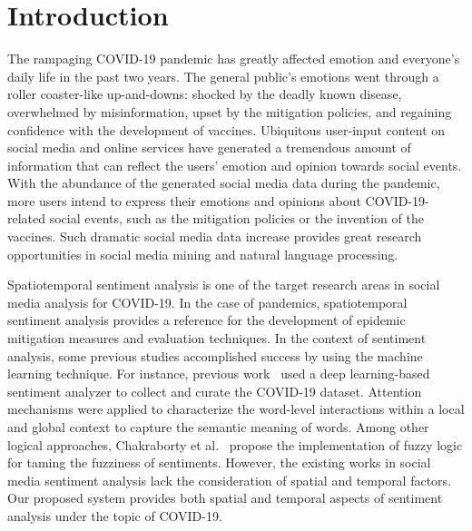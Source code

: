 \section{Introduction}
\label{sec:intro}
The rampaging COVID-19 pandemic has greatly affected emotion and everyone’s
daily life in the past two years. The general public’s emotions went through
a roller coaster-like up-and-downs: shocked by the deadly known disease,
overwhelmed by misinformation, upset by the mitigation policies, and
regaining confidence with the development of vaccines. Ubiquitous user-input
content on social media and online services have generated a tremendous
amount of information that can reflect the users’ emotion and opinion towards
social events. With the abundance of the generated social media data during
the pandemic, more users intend to express their emotions and opinions about
COVID-19-related social events, such as the mitigation policies or the
invention of the vaccines. Such dramatic social media data increase provides
great research opportunities in social media mining and natural language
processing.  

Spatiotemporal sentiment analysis is one of the target research areas in
social media analysis for COVID-19. In the case of pandemics, spatiotemporal
sentiment analysis provides a reference for the development of epidemic
mitigation measures and evaluation techniques. In the context of sentiment
analysis, some previous studies accomplished success by using the machine
learning technique. For instance, previous work~\cite{kastrati2021deep} used
a deep learning-based sentiment analyzer to collect and curate the COVID-19
dataset. Attention mechanisms were applied to characterize the word-level
interactions within a local and global context to capture the semantic
meaning of words. Among other logical approaches, Chakraborty et al.~\cite
{chakraborty2020sentiment} propose the implementation of fuzzy logic for
taming the fuzziness of sentiments. However, the existing works in social
media sentiment analysis lack the consideration of spatial and temporal
factors. Our proposed system provides both spatial and temporal aspects of
sentiment analysis under the topic of COVID-19. 

